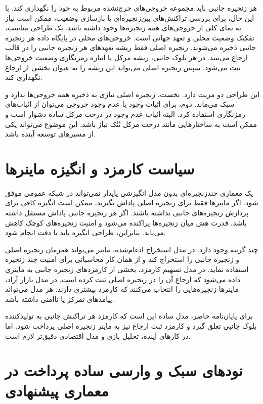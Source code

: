 هر زنجیره جانبی باید مجموعه خروجی‌های خرج‌نشده مربوط به خود را نگهداری کند. با این حال، برای بررسی تراکنش‌های بین‌زنجیره‌ای یا بازسازی وضعیت، ممکن است نیاز به نمای کلی از خروجی‌های همه زنجیره‌ها وجود داشته باشد. یک طراحی مناسب، تفکیک وضعیت محلی و تعهد جهانی است. خروجی‌های محلی در پایگاه داده هر زنجیره جانبی ذخیره می‌شوند. زنجیره اصلی فقط ریشه تعهدهای هر زنجیره جانبی را در قالب ارجاع می‌بیند. در هر بلوک جانبی، ریشه مرکل یا انباره رمزنگاری وضعیت خروجی‌ها ثبت می‌شود. سپس زنجیره اصلی می‌تواند این ریشه را به عنوان بخشی از ارجاع نگهداری کند.

این طراحی دو مزیت دارد. نخست، زنجیره اصلی نیازی به ذخیره همه خروجی‌ها ندارد و سبک می‌ماند. دوم، برای اثبات وجود یا عدم وجود خروجی می‌توان از اثبات‌های رمزنگاری استفاده کرد. البته اثبات عدم وجود در درخت مرکل ساده دشوار است و ممکن است به ساختارهایی مانند درخت مرکل تُنُک نیاز باشد. این موضوع می‌تواند یکی از مسیرهای توسعه آینده باشد.

\section{سیاست کارمزد و انگیزه ماینرها}

یک معماری چندزنجیره‌ای بدون مدل انگیزشی پایدار نمی‌تواند در شبکه عمومی موفق شود. اگر ماینرها فقط برای زنجیره اصلی پاداش بگیرند، ممکن است انگیزه کافی برای پردازش زنجیره‌های جانبی نداشته باشند. اگر هر زنجیره جانبی پاداش مستقل داشته باشد، قدرت هش میان زنجیره‌ها پراکنده می‌شود و امنیت زنجیره‌های کوچک کاهش می‌یابد. بنابراین، طراحی انگیزه باید با دقت انجام شود.

چند گزینه وجود دارد. در مدل استخراج ادغام‌شده، ماینر می‌تواند همزمان زنجیره اصلی و زنجیره جانبی را استخراج کند و از همان کار محاسباتی برای امنیت چند زنجیره استفاده نماید. در مدل تسهیم کارمزد، بخشی از کارمزدهای زنجیره جانبی به ماینری داده می‌شود که ارجاع آن را در زنجیره اصلی ثبت کرده است. در مدل بازار آزاد، ماینرها زنجیره‌هایی را انتخاب می‌کنند که کارمزد بیشتری دارند. هر مدل می‌تواند پیامدهای تمرکز یا ناامنی داشته باشد.

برای پایان‌نامه حاضر، مدل ساده این است که کارمزد هر تراکنش جانبی به تولیدکننده بلوک جانبی تعلق گیرد و کارمزد ثبت ارجاع نیز به ماینر زنجیره اصلی پرداخت شود. اما در کارهای آینده، تحلیل بازی و مدل اقتصادی دقیق‌تر لازم است.

\section{نودهای سبک و وارسی ساده پرداخت در معماری پیشنهادی}

